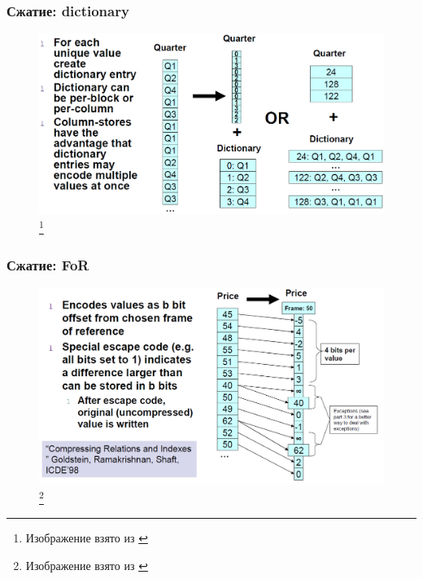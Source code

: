 \documentclass{beamer}
\begin{document}
\begin{frame}
\frametitle{Сжатие: dictionary}

\begin{figure}[htb]
\includegraphics[width=\textwidth,height=0.75\textheight,keepaspectratio]{compression3.png} 
\footnote{\tiny{Изображение взято из \cite{Harizopoulos2009}}}
 \end{figure}    

\end{frame}

\begin{frame}
\frametitle{Сжатие: FoR}

\begin{figure}[htb]
\includegraphics[width=\textwidth,height=0.75\textheight,keepaspectratio]{compression4.png} 
\footnote{\tiny{Изображение взято из \cite{Harizopoulos2009}}}
 \end{figure}    

\end{frame}
\end{document}
